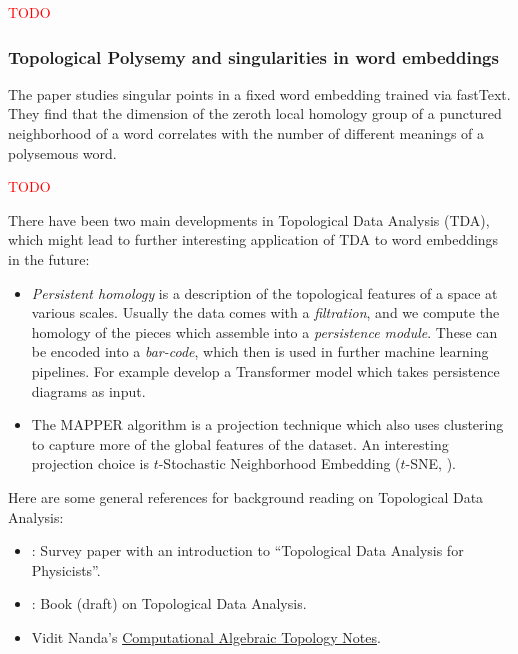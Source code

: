 \documentclass[11pt, a4paper]{amsart}
\begin{document}
\textcolor{red}{TODO}

\subsubsection{Topological Polysemy and singularities in word embeddings}

The paper \cite{jakubowski2020topology} studies singular points in a fixed word embedding trained via fastText.
They find that the dimension of the zeroth local homology group of a punctured neighborhood of a word correlates with the number of different meanings of a polysemous word.

\textcolor{red}{TODO}

There have been two main developments in Topological Data Analysis (TDA), which might lead to further interesting application of TDA to word embeddings in the future:
\begin{itemize}
        \item \emph{Persistent homology} is a description of the topological features of a space at various scales.
        Usually the data comes with a \emph{filtration}, and we compute the homology of the pieces which assemble into a \emph{persistence module}.
        These can be encoded into a \emph{bar-code}, which then is used in further machine learning pipelines.
        For example \cite{reinauer2021persformer} develop a Transformer model which takes persistence diagrams as input. 
        
        \item The MAPPER algorithm is a projection technique which also uses clustering to capture more of the global features of the dataset.
        An interesting projection choice is $t$-Stochastic Neighborhood Embedding ($t$-SNE, \cite{JMLR:v9:vandermaaten08a}).
\end{itemize}

Here are some general references for background reading on Topological Data Analysis:
\begin{itemize}
    \item \cite{murugan2019introduction}: Survey paper with an introduction to ``Topological Data Analysis for Physicists''.
    \item \cite{dey2021computational}: Book (draft) on Topological Data Analysis.
    \item Vidit Nanda's \href{http://people.maths.ox.ac.uk/nanda/cat/TDANotes.pdf}{Computational Algebraic Topology Notes}.
\end{itemize}

\newpage
\printbibliography
\end{document}
